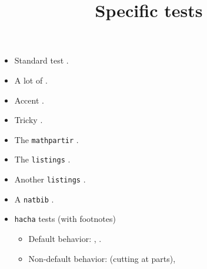 \documentclass{article}
\title{Specific tests}
\author{}
\date{}
\begin{document}
\maketitle
\begin{itemize}
\item Standard test .
\item A lot of .
\item Accent .
\item Tricky .
\item The \texttt{mathpartir} .
\item The \texttt{listings} .
\item Another \texttt{listings} .
\item A \texttt{natbib} .
\item \texttt{hacha} tests (with footnotes)
\begin{itemize}
\item Default behavior: ,
.
\item Non-default behavior: 
(cutting at parts), 
\end{itemize}
\end{itemize}
\end{document}
